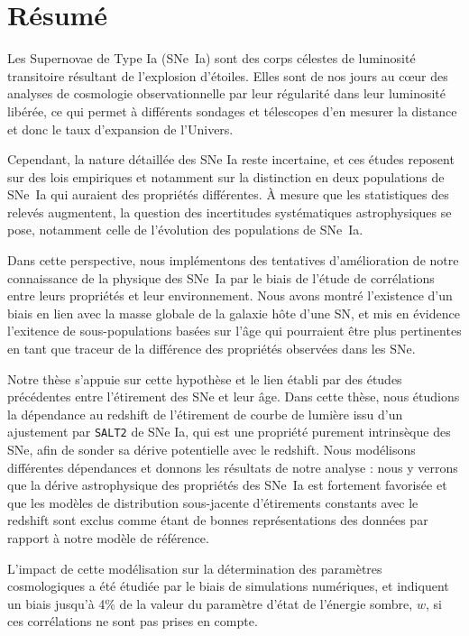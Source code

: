 \documentclass[../main/main.tex]{subfiles}
\begin{document}
\chapter*{Résumé}\label{ch:resume}

Les Supernovae de Type Ia (SNe~Ia) sont des corps célestes de luminosité
transitoire résultant de l'explosion d'étoiles. Elles sont de nos jours au cœur
des analyses de cosmologie observationnelle par leur régularité dans leur
luminosité libérée, ce qui permet à différents sondages et télescopes d'en
mesurer la distance et donc le taux d'expansion de l'Univers.

Cependant, la nature détaillée des SNe Ia reste incertaine, et ces études
reposent sur des lois empiriques et notamment sur la distinction en deux
populations de SNe~Ia qui auraient des propriétés différentes. À mesure que les
statistiques des relevés augmentent, la question des incertitudes systématiques
astrophysiques se pose, notamment celle de l'évolution des populations de
SNe~Ia.

Dans cette perspective, nous implémentons des tentatives d'amélioration de notre
connaissance de la physique des SNe~Ia par le biais de l'étude de corrélations
entre leurs propriétés et leur environnement. Nous avons montré l'existence d'un
biais en lien avec la masse globale de la galaxie hôte d'une SN, et mis en
évidence l'exitence de sous-populations basées sur l'âge qui pourraient être
plus pertinentes en tant que traceur de la différence des propriétés observées
dans les SNe.

Notre thèse s'appuie sur cette hypothèse et le lien établi par des études
précédentes entre l'étirement des SNe et leur âge. Dans cette thèse, nous
étudions la dépendance au redshift de l'étirement de courbe de lumière issu d'un
ajustement par \texttt{SALT2} de SNe Ia, qui est une propriété purement
intrinsèque des SNe, afin de sonder sa dérive potentielle avec le redshift. Nous
modélisons différentes dépendances et donnons les résultats de notre analyse :
nous y verrons que la dérive astrophysique des propriétés des SNe~Ia est
fortement favorisée et que les modèles de distribution sous-jacente d'étirements
constants avec le redshift sont exclus comme étant de bonnes représentations des
données par rapport à notre modèle de référence.

L'impact de cette modélisation sur la détermination des paramètres cosmologiques
a été étudiée par le biais de simulations numériques, et indiquent un biais
jusqu'à 4\% de la valeur du paramètre d'état de l'énergie sombre, $w$, si ces
corrélations ne sont pas prises en compte.
\end{document}
